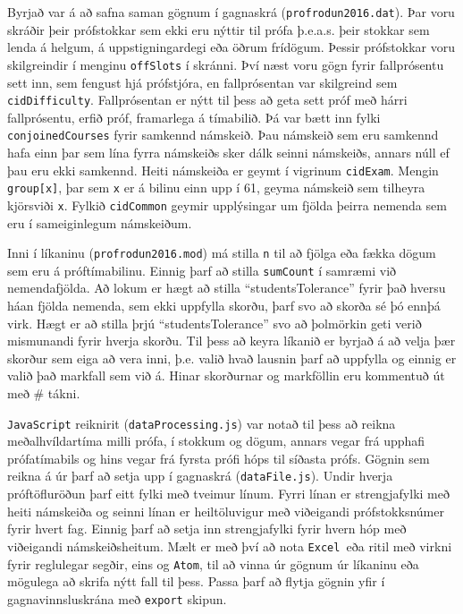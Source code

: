 \documentclass[12pt]{article}
\begin{document}
Byrjað var á að safna saman gögnum í gagnaskrá (\texttt{profrodun2016.dat}).  Þar voru skráðir þeir prófstokkar sem ekki eru nýttir til prófa þ.e.a.s. þeir stokkar sem lenda á helgum, á uppstigningardegi eða öðrum frídögum. Þessir prófstokkar voru skilgreindir í menginu \texttt{offSlots} í skránni. Því næst voru gögn fyrir fallprósentu sett inn, sem fengust hjá prófstjóra, en fallprósentan var skilgreind sem  \texttt{cidDifficulty}.  Fallprósentan er nýtt til þess að geta sett próf með hárri fallprósentu, erfið próf, framarlega á tímabilið. Þá var bætt inn fylki \texttt{conjoinedCourses} fyrir samkennd námskeið. Þau námskeið sem eru samkennd hafa einn þar sem lína fyrra námskeiðs sker dálk seinni námskeiðs, annars núll ef þau eru ekki samkennd. Heiti námskeiða er geymt í vigrinum \texttt{cidExam}. Mengin \texttt{group[x]}, þar sem \texttt{x} er á bilinu einn upp í 61, geyma námskeið sem tilheyra kjörsviði \texttt{x}.   Fylkið \texttt{cidCommon} geymir upplýsingar um fjölda þeirra nemenda sem eru í sameiginlegum námskeiðum. 

\medskip

Inni í líkaninu (\texttt{profrodun2016.mod}) má stilla \texttt{n} til að fjölga eða fækka dögum sem eru á próftímabilinu. Einnig þarf að stilla \texttt{sumCount} í samræmi við nemendafjölda. Að lokum er hægt að stilla “studentsTolerance” fyrir það hversu háan fjölda nemenda, sem ekki uppfylla skorðu, þarf svo að skorða sé þó ennþá virk. Hægt er að stilla þrjú “studentsTolerance” svo að þolmörkin geti verið mismunandi fyrir hverja skorðu. 
Til þess að keyra líkanið er byrjað á að velja þær skorður sem eiga að vera inni, þ.e. valið hvað lausnin þarf að uppfylla og einnig er valið það markfall sem við á. Hinar skorðurnar og markföllin eru kommentuð út með \# tákni. 

\medskip

\texttt{JavaScript} reiknirit (\texttt{dataProcessing.js}) var notað til þess að reikna meðalhvíldartíma milli prófa, í stokkum og dögum,  annars vegar frá upphafi prófatímabils og hins vegar frá fyrsta prófi hóps til síðasta prófs. Gögnin sem reikna á úr þarf að setja upp í gagnaskrá (\texttt{dataFile.js}). Undir hverja próftöfluröðun þarf eitt fylki með tveimur línum. Fyrri línan er strengjafylki með heiti námskeiða og seinni línan er heiltöluvigur með viðeigandi prófstokksnúmer fyrir hvert fag. Einnig þarf að setja inn strengjafylki fyrir hvern hóp með viðeigandi námskeiðsheitum. Mælt er með því að nota \texttt{Excel }eða ritil með virkni fyrir reglulegar segðir, eins og \texttt{Atom}, til að vinna úr gögnum úr líkaninu eða mögulega að skrifa nýtt fall til þess. Passa þarf að flytja gögnin yfir í gagnavinnsluskrána með \texttt{export} skipun.
\end{document}
